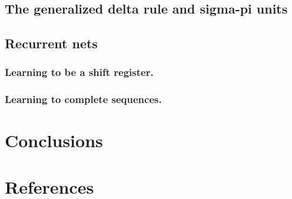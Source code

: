\documentclass[10pt,letterpaper]{article}
\begin{document}
	\subsection{The generalized delta rule and sigma-pi units}
	\subsection{Recurrent nets}
	\subsubsection{Learning to be a shift register.}
	\subsubsection{Learning to complete sequences.}
	
	\section{Conclusions}
	\section{References}
	
	
\end{document}
